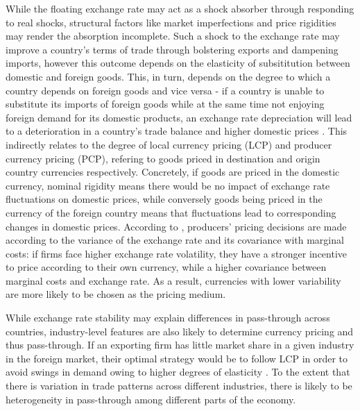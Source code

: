 \documentclass[12pt]{article}
\begin{document}
While the floating exchange rate may act as a shock absorber through responding to real shocks, structural factors like market imperfections and price rigidities may render the absorption incomplete. 
Such a shock to the exchange rate may improve a country's terms of trade through bolstering exports and dampening imports, however this outcome depends on the elasticity of subsititution between domestic and foreign goods. This, in turn, depends on the degree to which a country depends on foreign goods and vice versa - 
if a country is unable to substitute its imports of foreign goods while at the same time not enjoying foreign demand for its domestic products, an exchange rate depreciation will lead to a deterioration in a country's trade balance and higher domestic prices \parencite{obstfeld1995exchange}. 
This indirectly relates to the degree of local currency pricing (LCP) and producer currency pricing (PCP), refering to goods priced in destination and origin country currencies respectively. 
Concretely, if goods are priced in the domestic currency, nominal rigidity means there would be no impact of exchange rate fluctuations on domestic prices, while conversely goods being priced in the currency of the foreign country means that fluctuations lead to corresponding changes in domestic prices. According to \textcite{devereux2004endogenous}, producers' pricing  decisions are made according to the variance of the exchange  rate and its covariance with marginal costs: if firms face higher exchange rate volatility, they have a stronger incentive to price according to their own currency, while a higher covariance between marginal costs and exchange rate. As a result, currencies with lower variability are more likely to be chosen as the pricing medium. 

While exchange rate stability may explain differences in pass-through across countries, industry-level features are also likely to determine currency pricing and thus pass-through. If an exporting firm has little market share in a given industry in the foreign market, their optimal strategy would be to follow LCP in order to avoid swings in demand owing to higher degrees of elasticity \parencite{NBERw9039}. To the extent that there is variation in trade patterns across different industries, there is likely to be heterogeneity in pass-through among different parts of the economy. 
\end{document}
